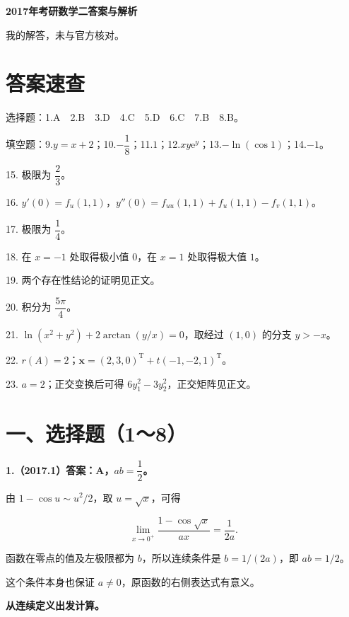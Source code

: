 \documentclass[UTF8,11pt,fontset=windows]{ctexart}
\begin{document}
{\LARGE\bfseries 2017年考研数学二答案与解析\par}\vspace{6pt}

\begingroup\color{gray}我的解答，未与官方核对。\par\endgroup

\section*{答案速查}

\begingroup\color{gray}选择题：1.A　2.B　3.D　4.C　5.D　6.C　7.B　8.B。\par\endgroup

\begingroup\color{gray}填空题：9.$y=x+2$；10.$-\dfrac18$；11.$1$；12.$xy\mathrm e^y$；13.$-\ln(\cos1)$；14.$-1$。\par\endgroup

15. 极限为 $\dfrac23$。

16. $y'(0)=f_u(1,1)$，$y''(0)=f_{uu}(1,1)+f_u(1,1)-f_v(1,1)$。

17. 极限为 $\dfrac14$。

18. 在 $x=-1$ 处取得极小值 $0$，在 $x=1$ 处取得极大值 $1$。

19. 两个存在性结论的证明见正文。

20. 积分为 $\dfrac{5\pi}{4}$。

21. $\ln(x^2+y^2)+2\arctan(y/x)=0$，取经过 $(1,0)$ 的分支 $y>-x$。

22. $r(A)=2$；$\boldsymbol x=(2,3,0)^{\mathrm T}+t(-1,-2,1)^{\mathrm T}$。

23. $a=2$；正交变换后可得 $6y_1^2-3y_2^2$，正交矩阵见正文。

\clearpage

\section*{一、选择题（1～8）}

\textbf{1.（2017.1）答案：A，$ab=\dfrac12$。}

由 $1-\cos u\sim u^2/2$，取 $u=\sqrt x$，可得

$$
\lim_{x\to0^+}\frac{1-\cos\sqrt x}{ax}
=\frac1{2a}.
$$

函数在零点的值及左极限都为 $b$，所以连续条件是 $b=1/(2a)$，即 $ab=1/2$。

这个条件本身也保证 $a\ne0$，原函数的右侧表达式有意义。

\textbf{从连续定义出发计算。}
\end{document}
